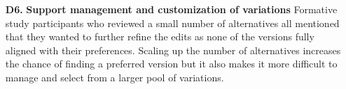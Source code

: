\begin{itemize}
    \item[\textbf{D6.}] \textbf{Support management and customization of variations}
    Formative study participants who reviewed a small number of alternatives all mentioned that they wanted to further refine the edits as none of the versions fully aligned with their preferences. Scaling up the number of alternatives increases the chance of finding a preferred version but it also makes it more difficult to manage and select from a larger pool of variations.
    

    
\end{itemize}



